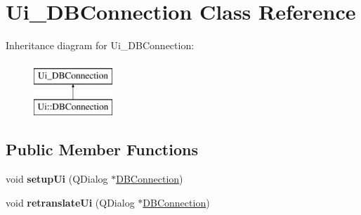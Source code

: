 \hypertarget{classUi__DBConnection}{\section{Ui\-\_\-\-D\-B\-Connection Class Reference}
\label{classUi__DBConnection}
}
Inheritance diagram for Ui\-\_\-\-D\-B\-Connection\-:\begin{figure}[H]
\begin{center}
\leavevmode
\includegraphics[height=2.000000cm]{classUi__DBConnection}
\end{center}
\end{figure}
\subsection*{Public Member Functions}
\begin{DoxyCompactItemize}
\item 
\hypertarget{classUi__DBConnection_acaf1a829dbcfeb5283bb65d04a190bf3}{void {\bfseries setup\-Ui} (Q\-Dialog $\ast$\hyperlink{classDBConnection}{D\-B\-Connection})}\label{classUi__DBConnection_acaf1a829dbcfeb5283bb65d04a190bf3}

\item 
\hypertarget{classUi__DBConnection_a7519839dbe5f8101d687a5ad6a58c600}{void {\bfseries retranslate\-Ui} (Q\-Dialog $\ast$\hyperlink{classDBConnection}{D\-B\-Connection})}\label{classUi__DBConnection_a7519839dbe5f8101d687a5ad6a58c600}

\end{DoxyCompactItemize}
